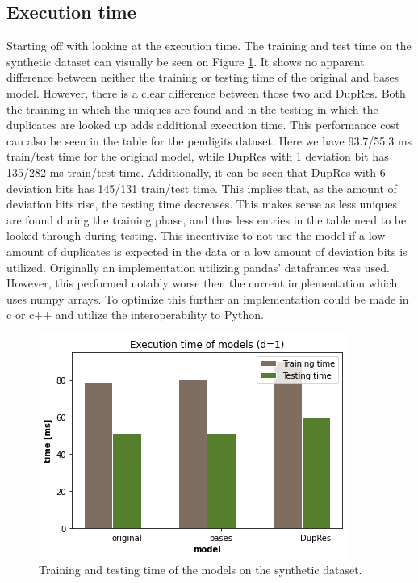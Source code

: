 \subsection{Execution time}
Starting off with looking at the execution time. The training and test time on the synthetic dataset can visually be seen on Figure \ref{fig:performance_time}. It shows no apparent difference between neither the training or testing time of the original and bases model. However, there is a clear difference between those two and DupRes. Both the training in which the uniques are found and in the testing in which the duplicates are looked up adds additional execution time. This performance cost can also be seen in the table for the pendigits dataset. Here we have 93.7/55.3 ms train/test time for the original model, while DupRes with 1 deviation bit has 135/282 ms train/test time. Additionally, it can be seen that DupRes with 6 deviation bits has 145/131 train/test time. This implies that, as the amount of deviation bits rise, the testing time decreases. This makes sense as less uniques are found during the training phase, and thus less entries in the table need to be looked through during testing. This incentivize to not use the model if a low amount of duplicates is expected in the data or a low amount of deviation bits is utilized. Originally an implementation utilizing pandas'\cite{pandas} dataframes was used. However, this performed notably worse then the current implementation which uses numpy\cite{numpy} arrays. To optimize this further an implementation could be made in c or c++ and utilize the interoperability to Python.

\begin{figure}
  \centering
  \includegraphics[width=0.8\linewidth]{images/performance_time.png}
  \caption{Training and testing time of the models on the synthetic dataset.}
  \label{fig:performance_time}
\end{figure}

